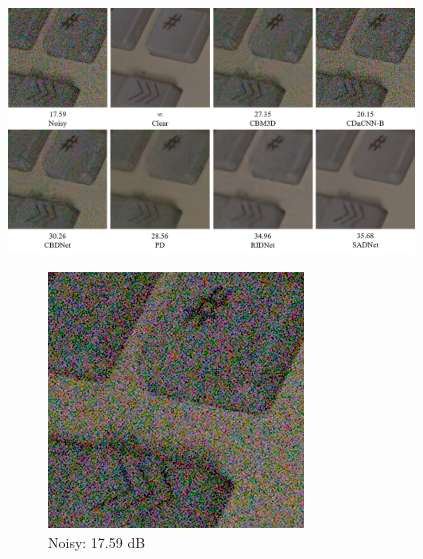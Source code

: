 \begin{figure}[t!]
    \centering
    \includegraphics[width=0.96\textwidth]{images/tus.png}
    \begin{subfigure}{0.24\textwidth}
        \includegraphics[width=\linewidth]{images/tus_noisy.png}
        \caption{Noisy: 17.59 dB}
        \label{fig:tus_noisy}
    \end{subfigure}\hfil %
    \begin{subfigure}{0.24\textwidth}

\end{subfigure}
\end{figure}
